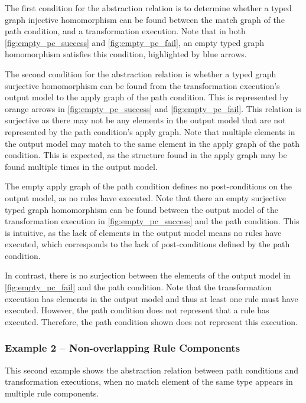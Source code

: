 The first condition for the abstraction relation is to determine whether a typed graph injective homomorphism can be found between the match graph of the path condition, and a transformation execution. Note that in both \cref{fig:empty_pc_success} and \cref{fig:empty_pc_fail}, an empty typed graph homomorphism satisfies this condition, highlighted by blue arrows.


The second condition for the abstraction relation is whether a typed graph surjective homomorphism can be found from the transformation execution's output model to the apply graph of the path condition. This is represented by orange arrows in \cref{fig:empty_pc_success} and \cref{fig:empty_pc_fail}. This relation is surjective as there may not be any elements in the output model that are not represented by the path condition's apply graph. Note that multiple elements in the output model may match to the same element in the apply graph of the path condition. This is expected, as the structure found in the apply graph may be found multiple times in the output model.


The empty apply graph of the path condition defines no post-conditions on the output model, as no rules have executed. Note that there an empty surjective typed graph homomorphism can be found between the output model of the transformation execution in \cref{fig:empty_pc_success} and the path condition. This is intuitive, as the lack of elements in the output model means no rules have executed, which corresponds to the lack of post-conditions defined by the path condition.


In contrast, there is no surjection between the elements of the output model in \cref{fig:empty_pc_fail} and the path condition. Note that the transformation execution has elements in the output model and thus at least one rule must have executed. However, the path condition does not represent that a rule has executed. Therefore, the path condition shown does not represent this execution. 




\subsubsection{Example 2 -- Non-overlapping Rule Components}


This second example shows the abstraction relation between path conditions and transformation executions, when no match element of the same type appears in multiple rule components.

